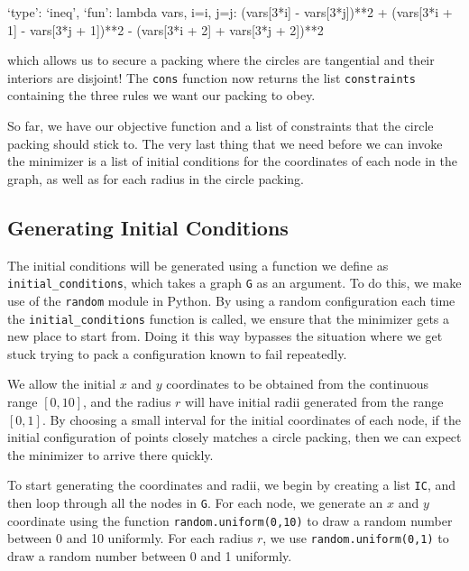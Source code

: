 \begin{code}
    {`type': `ineq', `fun': lambda vars, i=i, j=j: 
    (vars[3*i] - vars[3*j])**2 + (vars[3*i + 1] - vars[3*j + 1])**2 - 
    (vars[3*i + 2] + vars[3*j + 2])**2}
\end{code}

\begin{flushleft}
which allows us to secure a packing where the circles are tangential and their interiors are disjoint! The \texttt{cons} function now returns the list \texttt{constraints} containing the three rules we want our packing to obey. 
\end{flushleft}

\begin{flushleft}
So far, we have our objective function and a list of constraints that the circle packing should stick to. The very last thing that we need before we can invoke the minimizer is a list of initial conditions for the coordinates of each node in the graph, as well as for each radius in the circle packing.
\end{flushleft}

\subsection{Generating Initial Conditions}

\begin{flushleft}
The initial conditions will be generated using a function we define as \texttt{initial\_conditions}, which takes a graph \texttt{G} as an argument. To do this, we make use of the \texttt{random} \cite{random} module in Python. By using a random configuration each time the \texttt{initial\_conditions} function is called, we ensure that the minimizer gets a new place to start from. Doing it this way bypasses the situation where we get stuck trying to pack a configuration known to fail repeatedly.
\end{flushleft}

\begin{flushleft}
We allow the initial $x$ and $y$ coordinates to be obtained from the continuous range $[0,10]$, and the radius $r$ will have initial radii generated from the range $[0,1]$. By choosing a small interval for the initial coordinates of each node, if the initial configuration of points closely matches a circle packing, then we can expect the minimizer to arrive there quickly.
\end{flushleft}

\begin{flushleft}
To start generating the coordinates and radii, we begin by creating a list \texttt{IC}, and then loop through all the nodes in \texttt{G}. For each node, we generate an $x$ and $y$ coordinate using the function \texttt{random.uniform(0,10)} to draw a random number between 0 and 10 uniformly. For each radius $r$, we use \texttt{random.uniform(0,1)} to draw a random number between 0 and 1 uniformly.
\end{flushleft}

